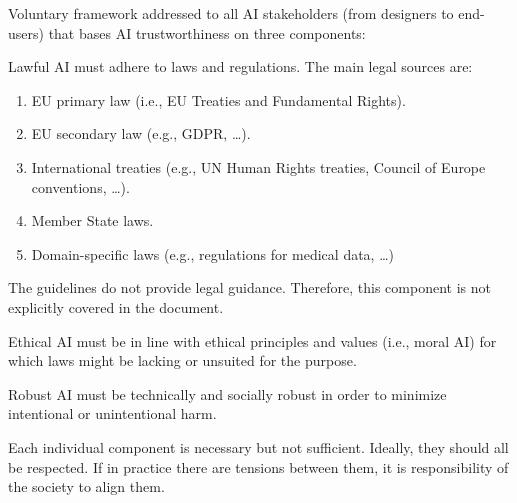 Voluntary framework addressed to all AI stakeholders (from designers to end-users) that bases AI trustworthiness on three components:
\begin{descriptionlist}
    \item[Lawful] 
        AI must adhere to laws and regulations. The main legal sources are:
        \begin{enumerate}
            \item EU primary law (i.e., EU Treaties and Fundamental Rights).
            \item EU secondary law (e.g., GDPR, \dots).
            \item International treaties (e.g., UN Human Rights treaties, Council of Europe conventions, \dots).
            \item Member State laws.
            \item Domain-specific laws (e.g., regulations for medical data, \dots)
        \end{enumerate}

        \begin{remark}
            The guidelines do not provide legal guidance. Therefore, this component is not explicitly covered in the document.
        \end{remark}

    \item[Ethical] 
        AI must be in line with ethical principles and values (i.e., moral AI) for which laws might be lacking or unsuited for the purpose.
    
    \item[Robust] 
        AI must be technically and socially robust in order to minimize intentional or unintentional harm.
\end{descriptionlist}

\begin{remark}
    Each individual component is necessary but not sufficient. Ideally, they should all be respected. If in practice there are tensions between them, it is responsibility of the society to align them.
\end{remark}

